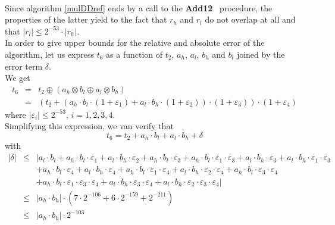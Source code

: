 \documentclass[a4paper,10pt,twoside]{article}
\newenvironment{proof}[1][Proof]{\begin{trivlist}
\item[\hskip \labelsep {\bfseries #1}]}{\end{trivlist}}
\newcommand{\hi}{\ensuremath{\mathit{h}}}
\newcommand{\lo}{\ensuremath{\mathit{l}}}
\newcommand{\Add}{{\bf Add12}}
\renewcommand{\epsilon}{\varepsilon}
\begin{document}
\begin{proof} ~ \\
Since algorithm \ref{mulDDref} ends by a call to the \Add~ procedure,
the properties of the latter yield to the fact that $r_\hi$ and $r_\lo$
do not overlap at all and that $\left \vert r_\lo \right \vert \leq 2^{-53} \cdot \left \vert r_\hi \right \vert$.\\
In order to give upper bounds for the relative and absolute error of the
algorithm, let us express $t_6$ as a function of $t_2$, $a_\hi$, $a_\lo$,
$b_\hi$ and $b_\lo$ joined by the error term $\delta$.\\
We get
\begin{eqnarray*}
t_6 & = & t_2 \oplus \left( a_\hi \otimes b_\lo \oplus a_\lo \otimes b_\hi \right) \\
& = & \left( t_2 + \left(a_\hi \cdot b_\lo \cdot \left( 1 + \epsilon_1 \right) + a_\lo \cdot b_\hi \cdot \left( 1 + \epsilon_2 \right) \right) \cdot
\left(1 + \epsilon_3 \right) \right)\cdot \left( 1 + \epsilon_4 \right)
\end{eqnarray*}
where $\left \vert \epsilon_i \right \vert \leq 2^{-53}$, $i=1,2,3,4$.\\
Simplifying this expression, we van verify that
$$t_6 = t_2 + a_\hi \cdot b_\lo + a_\lo \cdot b_\hi + \delta$$
with
\begin{eqnarray*}
\left \vert \delta \right \vert & \leq & \left \vert a_\lo \cdot b_\lo + a_\hi \cdot b_\lo \cdot \epsilon_1 + a_\lo \cdot b_\hi \cdot \epsilon_2 +
a_\hi \cdot b_\lo \cdot \epsilon_3 + a_\hi \cdot b_\lo \cdot \epsilon_1 \cdot \epsilon_3 + a_\lo \cdot b_\hi \cdot \epsilon_3 +
a_\lo \cdot b_\hi \cdot \epsilon_1 \cdot \epsilon_3 \right.\\
& & \left. + a_\hi \cdot b_\lo \cdot \epsilon_4 + a_\lo \cdot b_\hi \cdot \epsilon_4 +
a_\hi \cdot b_\lo \cdot \epsilon_1 \cdot \epsilon_4 + a_\lo \cdot b_\hi \cdot \epsilon_2 \cdot \epsilon_4 +
a_\hi \cdot b_\lo \cdot \epsilon_3 \cdot \epsilon_4 \right. \\
& & \left. + a_\hi \cdot b_\lo \cdot \epsilon_1 \cdot \epsilon_3 \cdot \epsilon_4 + a_\lo \cdot b_\hi \cdot \epsilon_3 \cdot \epsilon_4 + a_\lo \cdot b_\hi \cdot \epsilon_2 \cdot \epsilon_3 \cdot \epsilon_4 \right \vert \\
& \leq & \left \vert a_\hi \cdot b_\hi \right \vert \cdot \left( 7 \cdot 2^{-106} + 6 \cdot 2^{-159} + 2^{-211} \right) \\
& \leq & \left \vert a_\hi \cdot b_\hi \right \vert \cdot 2^{-103}
\end{eqnarray*}

\end{proof}
\end{document}
